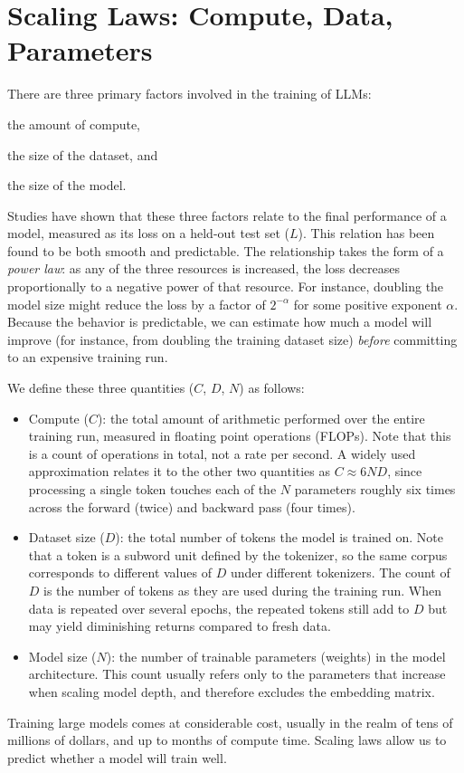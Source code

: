 \section{Scaling Laws: Compute, Data, Parameters}
\label{sec:scaling-laws}
There are three primary factors involved in the training of LLMs: \begin{enumerate*}[label=(\arabic*)]
    \item the amount of compute,
    \item the size of the dataset, and
    \item the size of the model.
\end{enumerate*}
Studies have shown that these three factors relate to the final performance of a model, measured as its loss on a held-out test set ($L$). This relation has been found to be  both smooth and predictable. The relationship takes the form of a \emph{power law}: as any of the three resources is increased, the loss decreases proportionally to a negative power of that resource. For instance, doubling the model size might reduce the loss by a factor of $2^{-\alpha}$ for some positive exponent $\alpha$. Because the behavior is predictable, we can estimate how much a model will improve (for instance, from doubling the training dataset size) \emph{before} committing to an expensive training run.

We define these three quantities ($C$, $D$, $N$)  as follows:
\begin{itemize}
    \item Compute ($C$): the total amount of arithmetic performed over the entire training run, measured in floating point operations (FLOPs). Note that this is a count of operations in total, not a rate per second. A widely used approximation relates it to the other two quantities as $C \approx 6ND$, since processing a single token touches each of the $N$ parameters roughly six times across the forward (twice) and backward pass (four times).
    \item Dataset size ($D$): the total number of tokens the model is trained on. Note that a token is a subword unit defined by the tokenizer, so the same corpus corresponds to different values of $D$ under different tokenizers. The count of $D$ is the number of tokens as they are used during the training run. When data is repeated over several epochs, the repeated tokens still add to $D$ but may yield diminishing returns compared to fresh data.
    \item Model size ($N$): the number of trainable parameters (weights) in the model architecture. This count usually refers only to the parameters that increase when scaling model depth, and therefore excludes the embedding matrix.
\end{itemize}
Training large models comes at considerable cost, usually in the realm of tens of millions of dollars, and up to months of compute time. Scaling laws allow us to predict whether a model will train well.


